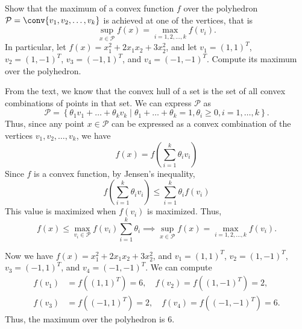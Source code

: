 \documentclass[11pt]{article}
\begin{document}
\begin{homeworkProblem}
    Show that the maximum of a convex function $f$ over the polyhedron $\mathcal{P} = \conv \{v_1, v_2, \dots, v_k\}$ is
    achieved at one of the vertices, that is
    \[
        \sup_{x \in \mathcal{P}} f(x) = \max_{i=1,2,\dots,k} f(v_i).
    \]
    In particular, let $f(x)=x_1^2+2 x_1 x_2+3 x_2^2$, and let $v_1=(1,1)^T$, $v_2=(1,-1)^T$, $v_3=(-1, 1)^T$, and $v_4=(-1,-1)^T$. Compute its maximum over the polyhedron. \\

    \solution

    From the text, we know that the convex hull of a set is the set of all convex combinations
    of points in that set. We can express $\mathcal{P}$ as
    \[
        \mathcal{P} = \left\{\theta_1 v_1 + \dots + \theta_k v_k \mid \theta_1 + \dots + \theta_k = 1, \theta_i \geq 0, i = 1, \dots, k\right\}.
    \]
    Thus, since any point $x \in \mathcal{P}$ can be expressed as a convex combination of the vertices $v_1, v_2, \dots, v_k$, we have
    \[
        f(x) = f\left(\sum_{i=1}^{k} \theta_i v_i\right)
    \]
    Since $f$ is a convex function, by Jensen's inequality,
    \[
        f\left(\sum_{i=1}^{k} \theta_i v_i\right) \leq \sum_{i=1}^{k} \theta_i f(v_i)
    \]
    This value is maximized when $f(v_i)$ is maximized. Thus,
    \[
        f(x) \leq \max_{v_i\in\mathcal{P}} f(v_i) \sum_{i=1}^{k} \theta_i \implies \sup_{x \in \mathcal{P}} f(x) = \max_{i=1,2,\dots,k} f(v_i).
    \]

    Now we have $f(x)=x_1^2+2 x_1 x_2+3 x_2^2$, and $v_1=(1,1)^T$, $v_2=(1,-1)^T$, $v_3=(-1, 1)^T$, and $v_4=(-1,-1)^T$. We can compute
    \begin{align*}
        f(v_1) & = f((1,1)^T) = 6, \quad f(v_2) = f((1,-1)^T) = 2,    \\
        f(v_3) & = f((-1, 1)^T) = 2, \quad f(v_4) = f((-1,-1)^T) = 6.
    \end{align*}
    Thus, the maximum over the polyhedron is $6$.
\end{homeworkProblem}

\pagebreak
\end{document}

